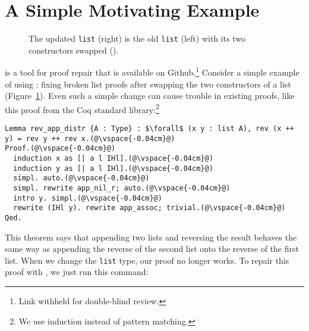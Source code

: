 \section{A Simple Motivating Example}
\label{sec:overview}

\begin{figure}
\begin{minipage}{0.46\textwidth}
   
\end{minipage}
\hfill
\begin{minipage}{0.46\textwidth}
   
\end{minipage}
\vspace{-0.3cm}
\caption{The updated \lstinline{list} (right) is the old \lstinline{list} (left) with its two constructors swapped ().}
\label{fig:listswap}
\end{figure}

\toolname is a tool for proof repair that is available on Github.\footnote{Link withheld for double-blind review.}
Consider a simple example of using \toolname: fixing broken list proofs after swapping the two constructors of a list (Figure~\ref{fig:listswap}).
Even such a simple change can cause trouble in existing proofs, like this proof from the Coq standard library:\footnote{We use induction instead of pattern matching.}

\begin{lstlisting}
Lemma rev_app_distr {A : Type} : $\forall$ (x y : list A), rev (x ++ y) = rev y ++ rev x.(@\vspace{-0.04cm}@)
Proof.(@\vspace{-0.04cm}@)
  induction x as [| a l IHl].(@\vspace{-0.04cm}@)
  induction y as [| a l IHl].(@\vspace{-0.04cm}@)
  simpl. auto.(@\vspace{-0.04cm}@)
  simpl. rewrite app_nil_r; auto.(@\vspace{-0.04cm}@)
  intro y. simpl.(@\vspace{-0.04cm}@)
  rewrite (IHl y). rewrite app_assoc; trivial.(@\vspace{-0.04cm}@)
Qed.
\end{lstlisting}
This theorem says that appending two lists and reversing the result behaves the same way as appending
the reverse of the second list onto the reverse of the first list.
When we change the \lstinline{list} type, our proof no longer works.
To repair this proof with \toolname, we just run this command:

